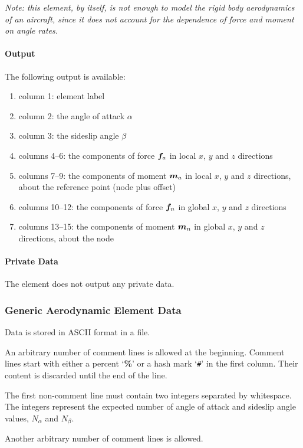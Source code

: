 \emph{Note: this element, by itself, is not enough to model
the rigid body aerodynamics of an aircraft, since it does not
account for the dependence of force and moment on angle rates.}

\paragraph{Output}
The following output is available:
\begin{enumerate}
\item column 1: element label
\item column 2: the angle of attack $\alpha$
\item column 3: the sideslip angle $\beta$
\item columns 4--6: the components of force $\boldsymbol{f}_a$
	in local $x$, $y$ and $z$ directions
\item columns 7--9: the components of moment $\boldsymbol{m}_a$
	in local $x$, $y$ and $z$ directions,
	about the reference point (node plus offset)
\item columns 10--12: the components of force $\boldsymbol{f}_n$
	in global $x$, $y$ and $z$ directions
\item columns 13--15: the components of moment $\boldsymbol{m}_n$
	in global $x$, $y$ and $z$ directions,
	about the node
\end{enumerate}

\paragraph{Private Data}
The  element does not output any private data.

\subsubsection{Generic Aerodynamic Element Data}
Data is stored in ASCII format in a file.

An arbitrary number of comment lines is allowed at the beginning.
Comment lines start with either a percent `\textbf{\%}'
or a hash mark `\texttt{\#}' in the first column.
Their content is discarded until the end of the line.

The first non-comment line must contain two integers separated by whitespace.
The integers represent the expected number of angle of attack
and sideslip angle values, $N_\alpha$ and $N_\beta$.

Another arbitrary number of comment lines is allowed.

